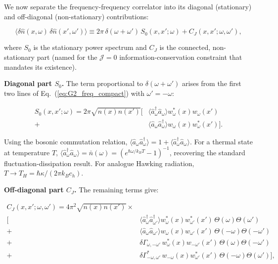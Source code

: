 \documentclass[prd,aps,showpacs,superscriptaddress,twocolumn]{revtex4-2}
\begin{document}
We now separate the frequency-frequency correlator into its diagonal (stationary) and off-diagonal (non-stationary) contributions:

\begin{equation}
\langle \delta\hat{n}(x,\omega) \, \delta\hat{n}(x',\omega') \rangle \equiv 2\pi \, \delta(\omega + \omega') \, S_0(x,x';\omega) + C_J(x,x';\omega,\omega'),
\label{eq:decomposition}
\end{equation}

where $S_0$ is the stationary power spectrum and $C_J$ is the connected, non-stationary part (named for the $\mathcal{J}=0$ information-conservation constraint that mandates its existence).

\textbf{Diagonal part $S_0$.} The term proportional to $\delta(\omega + \omega')$ arises from the first two lines of Eq.~(\ref{eq:G2_freq_compact}) with $\omega' = -\omega$:

\begin{align}
S_0(x,x';\omega) = 2\pi \sqrt{n(x) n(x')} \Big[ &\langle \hat{a}_\omega^\dagger \hat{a}_\omega \rangle w_\omega^*(x) w_\omega(x') \nonumber\\
+ &\langle \hat{a}_\omega \hat{a}_\omega^\dagger \rangle w_\omega(x) w_\omega^*(x') \Big].
\label{eq:S0}
\end{align}

Using the bosonic commutation relation, $\langle \hat{a}_\omega \hat{a}_\omega^\dagger \rangle = 1 + \langle \hat{a}_\omega^\dagger \hat{a}_\omega \rangle$. For a thermal state at temperature $T$, $\langle \hat{a}_\omega^\dagger \hat{a}_\omega \rangle = \bar{n}(\omega) = (e^{\hbar\omega/k_B T} - 1)^{-1}$, recovering the standard fluctuation-dissipation result. For analogue Hawking radiation, $T \to T_H = \hbar\kappa/(2\pi k_B c_h)$.

\textbf{Off-diagonal part $C_J$.} The remaining terms give:

\begin{align}
C_J(x,x';\omega,\omega') = 4\pi^2 \sqrt{n(x) n(x')} \times \nonumber\\
\Big[ &\langle \hat{a}_\omega^\dagger \hat{a}_{\omega'}^\dagger \rangle w_\omega^*(x) w_{\omega'}^*(x') \, \Theta(\omega) \Theta(\omega') \nonumber\\
+ &\langle \hat{a}_\omega \hat{a}_{\omega'} \rangle w_\omega(x) w_{\omega'}(x') \, \Theta(-\omega) \Theta(-\omega') \nonumber\\
+ &\delta\Gamma_{\omega,-\omega'} \, w_\omega^*(x) w_{-\omega'}(x') \, \Theta(\omega) \Theta(-\omega') \nonumber\\
+ &\delta\Gamma_{-\omega,\omega'}^* \, w_{-\omega}(x) w_{\omega'}^*(x') \, \Theta(-\omega) \Theta(\omega') \Big],
\label{eq:CJ_full}
\end{align}
\end{document}
